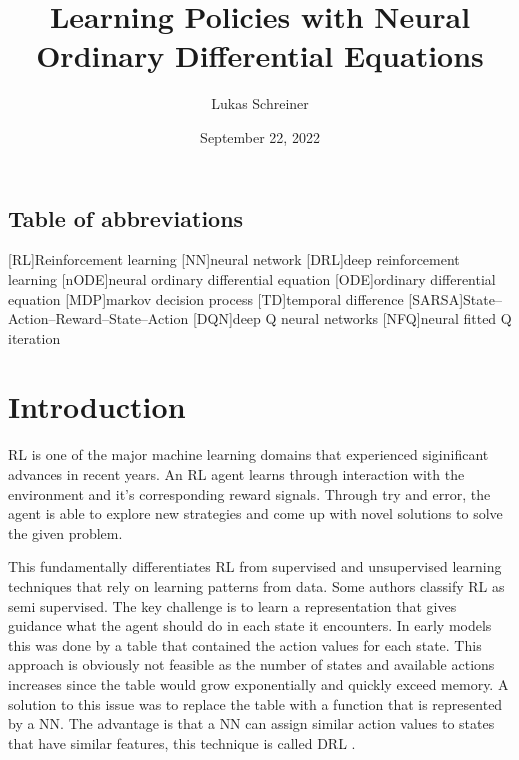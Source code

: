 \documentclass[10pt]{reportMaster}
\title{Learning Policies with Neural Ordinary Differential Equations}
\author{Lukas Schreiner}
\date{September 22, 2022}
\begin{document}
\maketitle

\tableofcontents

\newpage

\section*{Table of abbreviations}

\begin{acronym}

[RL]{Reinforcement learning}
[NN]{neural network}
[DRL]{deep reinforcement learning}
[nODE]{neural ordinary differential equation}
[ODE]{ordinary differential equation}
[MDP]{markov decision process}
[TD]{temporal difference}
[SARSA]{State–Action–Reward–State–Action}
[DQN]{deep Q neural networks}
[NFQ]{neural fitted Q iteration}

\end{acronym}

\newpage

\chapter{Introduction} \label{Introduction}

\ac{RL} is one of the major machine learning domains that experienced siginificant advances in recent years. An \ac{RL} agent learns through interaction with the environment and it's corresponding reward signals. Through try and error, the agent is able to explore new strategies and come up with novel solutions to solve the given problem. 

This fundamentally differentiates \ac{RL} from supervised and unsupervised learning techniques that rely on learning patterns from data. Some authors classify \ac{RL} as semi supervised. The key challenge is to learn a representation that gives guidance what the agent should do in each state it encounters. In early models this was done by a table that contained the action values for each state. This approach is obviously not feasible as the number of states and available actions increases since the table would grow exponentially and quickly exceed memory. A solution to this issue was to replace the table with a function that is represented by a \ac{NN}. The advantage is that a \ac{NN} can assign similar action values to states that have similar features, this technique is called \ac{DRL} \cite{mnih2013playing}. 
\end{document}
